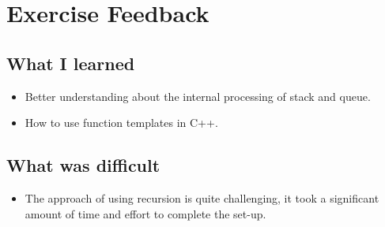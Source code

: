 \documentclass[a4paper, 12pt]{article}
\begin{document}
\section{Exercise Feedback}
\subsection{What I learned}
\begin{flushleft}
	\begin{itemize}
		\item Better understanding about the internal processing of stack and queue.
		\item How to use function templates in C++.
	\end{itemize}
\end{flushleft}
\subsection{What was difficult}
\begin{flushleft}
	\begin{itemize}
		\item The approach of using recursion is quite challenging, it took a significant amount of time and effort to complete the set-up.
	\end{itemize}
\end{flushleft}
\end{document}
